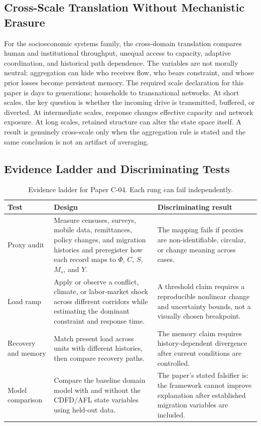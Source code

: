 \documentclass[11pt,a4paper]{article}
\begin{document}
\subsection{Cross-Scale Translation Without Mechanistic Erasure}

For the socioeconomic systems family, the cross-domain translation compares human and institutional throughput, unequal access to capacity, adaptive coordination, and historical path dependence. The variables are not morally neutral: aggregation can hide who receives flow, who bears constraint, and whose prior losses become persistent memory. \cite{BarabasiAlbert1999,WattsStrogatz1998,Holling1973,Shannon1948}
The required scale declaration for this paper is days to generations; households to transnational networks. At short
scales, the key question is whether the incoming drive is transmitted,
buffered, or diverted. At intermediate scales, response changes effective
capacity and network exposure. At long scales, retained structure can alter the
state space itself. A result is genuinely cross-scale only when the aggregation
rule is stated and the same conclusion is not an artifact of averaging.

\subsection{Evidence Ladder and Discriminating Tests}

\begin{table}[htbp]
\centering
\small
\caption{Evidence ladder for Paper C-04. Each rung can fail independently.}
\begin{tabularx}{\textwidth}{|p{}|X|X|}
\hline
\textbf{Test} & \textbf{Design} & \textbf{Discriminating result} \\
\hline
Proxy audit & Measure censuses, surveys, mobile data, remittances, policy changes, and migration histories and preregister how each record maps to $\Phi$, $C$, $S$, $M_s$, and $Y$. & The mapping fails if proxies are non-identifiable, circular, or change meaning across cases. \\
\hline
Load ramp & Apply or observe a conflict, climate, or labor-market shock across different corridors while estimating the dominant constraint and response time. & A threshold claim requires a reproducible nonlinear change and uncertainty bounds, not a visually chosen breakpoint. \\
\hline
Recovery and memory & Match present load across units with different histories, then compare recovery paths. & The memory claim requires history-dependent divergence after current conditions are controlled. \\
\hline
Model comparison & Compare the baseline domain model with and without the CDFD/AFL state variables using held-out data. & The paper's stated falsifier is: the framework cannot improve explanation after established migration variables are included. \\
\hline
\end{tabularx}
\end{table}
\end{document}
